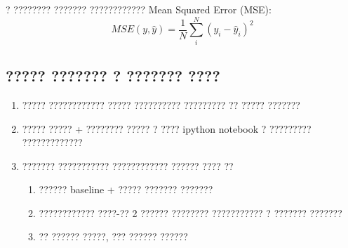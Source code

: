 \documentclass[a4paper, 12pt]{article}
\begin{document}
? ???????? ??????? ???????????? Mean Squared Error (MSE):
$$MSE(y, \hat{y}) = \frac{1}{N}\sum_i^N (y_i - \hat{y}_i)^2$$

\subsection*{????? ??????? ? ??????? ????}
\begin{enumerate}
	\item ????? ???????????? ????? ?????????? ????????? ?? ????? ???????
    \item ????? ?????  + ???????? ????? ? ???? ipython notebook ? ????????? ?????????????
    \item ??????? ??????????? ???????????? ?????? ???? ??
   	\begin{enumerate}
		\item ?????? baseline + ????? ??????? ???????
        \item ???????????? ????-?? 2 ?????? ???????? ??????????? ? ??????? ???????
        \item ?? ?????? ?????, ??? ?????? ??????
	\end{enumerate}
\end{enumerate}
\end{document}
